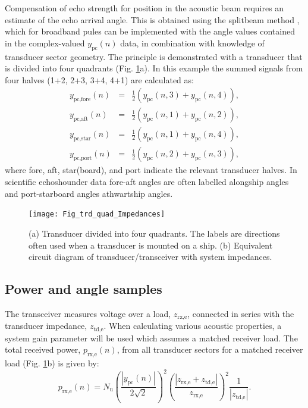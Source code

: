 \documentclass[preprint,12pt,TurnOnLineNumbers]{JASAnew}
\newcommand{\samplesymt}{n}
\newcommand{\nchannels}{N_{\textrm{u}}}
\newcommand{\zrxe}{z_{\textrm{rx,e}}}
\newcommand{\ztde}{z_{\textrm{td,e}}}
\newcommand{\prxe}{p_{\textrm{rx,e}}}
\newcommand{\ypc}{y_{\textrm{pc}}}
\begin{document}
Compensation of echo strength for position in the acoustic beam requires an estimate of the echo arrival angle. This is obtained using the splitbeam method \citep{burdic1991}, which for broadband pules can be implemented with the angle values contained in the complex-valued $\ypc(\samplesymt)$ data, in combination with knowledge of transducer sector geometry. The principle is demonstrated with a transducer that is divided into four quadrants (Fig. \ref{fi:Fig_trd_quad_Impedances}a). In this example the summed signals from four halves (1+2, 2+3, 3+4, 4+1) are calculated as:
\begin{eqnarray}
\label{eq:SumHalves}
y_{\textrm{pc,fore}}(\samplesymt) & = & \frac{1}{2} \left( \ypc(\samplesymt,3)+\ypc(\samplesymt,4) \right),\\
y_{\textrm{pc,aft}}(\samplesymt) & = & \frac{1}{2} \left( \ypc(\samplesymt,1)+\ypc(\samplesymt,2) \right),\\
y_{\textrm{pc,star}}(\samplesymt) & = & \frac{1}{2} \left( \ypc(\samplesymt,1)+\ypc(\samplesymt,4) \right),\\
y_{\textrm{pc,port}}(\samplesymt) & = & \frac{1}{2} \left( \ypc(\samplesymt,2)+\ypc(\samplesymt,3) \right),
\end{eqnarray}
%
where fore, aft, star(board), and port indicate the relevant transducer halves. In scientific echoshounder data fore-aft angles are often labelled  alongship angles and  port-starboard angles athwartship angles.

\begin{figure}
\texttt{[image: Fig\_trd\_quad\_Impedances]}
\caption{\label{fi:Fig_trd_quad_Impedances}(a) Transducer divided into four quadrants. The labels are directions often used when a transducer is mounted on a ship. (b) Equivalent circuit diagram of transducer/transceiver with system impedances.}
\end{figure}
%

\subsection{Power and angle samples}
The transceiver measures voltage over a load, $\zrxe$, connected in series with the transducer impedance, $\ztde$. When calculating various acoustic properties, a system gain parameter will be used which assumes a matched receiver load. The total received power, $\prxe(\samplesymt)$, from all transducer sectors for a matched receiver load (Fig. \ref{fi:Fig_trd_quad_Impedances}b) is given by: 
\begin{equation}
\label{eq:prx}
\prxe(\samplesymt) = \nchannels\left( \frac{|\ypc(\samplesymt)|}{2\sqrt{2}} \right)^2 \left( \frac{|\zrxe+\ztde|}{\zrxe} \right)^2 \frac{1}{|\ztde|}.
\end{equation}
%
\end{document}
